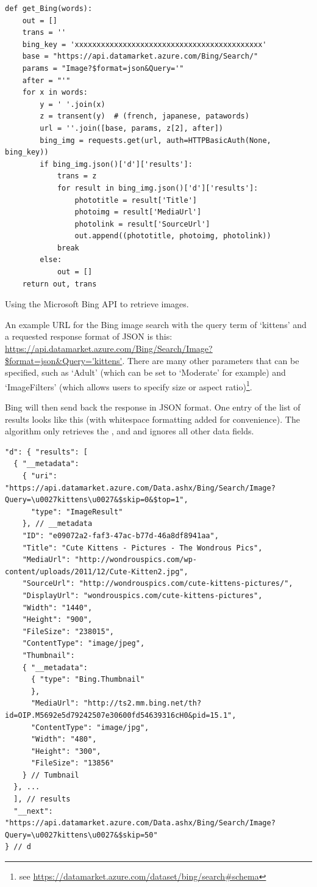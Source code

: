 \begin{listing}
  \begin{verbatim}
def get_Bing(words):
    out = []
    trans = ''
    bing_key = 'xxxxxxxxxxxxxxxxxxxxxxxxxxxxxxxxxxxxxxxxxxx'
    base = "https://api.datamarket.azure.com/Bing/Search/"
    params = "Image?$format=json&Query='"
    after = "'"
    for x in words:
        y = ' '.join(x)
        z = transent(y)  # (french, japanese, patawords)
        url = ''.join([base, params, z[2], after])
        bing_img = requests.get(url, auth=HTTPBasicAuth(None, bing_key))
        if bing_img.json()['d']['results']:
            trans = z
            for result in bing_img.json()['d']['results']:
                phototitle = result['Title']
                photoimg = result['MediaUrl']
                photolink = result['SourceUrl']
                out.append((phototitle, photoimg, photolink))
            break
        else:
            out = []
    return out, trans
  \end{verbatim}
\caption{Using the Microsoft Bing API to retrieve images.}
\label{code:getBing}
\end{listing}

An example \ac{URL} for the Bing image search with the query term of `kittens' and a requested response format of \ac{JSON} is this:
\url{https://api.datamarket.azure.com/Bing/Search/Image?$format=json&Query='kittens'}. There are many other parameters that can be specified, such as `Adult' (which can be set to `Moderate' for example) and `ImageFilters' (which allows users to specify size or aspect ratio)\footnote{see \url{https://datamarket.azure.com/dataset/bing/search\#schema}}.

Bing will then send back the response in \ac{JSON} format. One entry of the list of results looks like this (with whitespace formatting added for convenience). The algorithm only retrieves the ,  and  and ignores all other data fields.

\begin{verbatim}
"d": { "results": [
  { "__metadata":
    { "uri": "https://api.datamarket.azure.com/Data.ashx/Bing/Search/Image?Query=\u0027kittens\u0027&$skip=0&$top=1",
      "type": "ImageResult"
    }, // __metadata
    "ID": "e09072a2-faf3-47ac-b77d-46a8df8941aa",
    "Title": "Cute Kittens - Pictures - The Wondrous Pics",
    "MediaUrl": "http://wondrouspics.com/wp-content/uploads/2011/12/Cute-Kitten2.jpg",
    "SourceUrl": "http://wondrouspics.com/cute-kittens-pictures/",
    "DisplayUrl": "wondrouspics.com/cute-kittens-pictures",
    "Width": "1440",
    "Height": "900",
    "FileSize": "238015",
    "ContentType": "image/jpeg",
    "Thumbnail":
    { "__metadata":
      { "type": "Bing.Thumbnail"
      },
      "MediaUrl": "http://ts2.mm.bing.net/th?id=OIP.M5692e5d79242507e30600fd54639316cH0&pid=15.1",
      "ContentType": "image/jpg",
      "Width": "480",
      "Height": "300",
      "FileSize": "13856"
    } // Tumbnail
  }, ...
  ], // results
  "__next": "https://api.datamarket.azure.com/Data.ashx/Bing/Search/Image?Query=\u0027kittens\u0027&$skip=50"
} // d
\end{verbatim}


